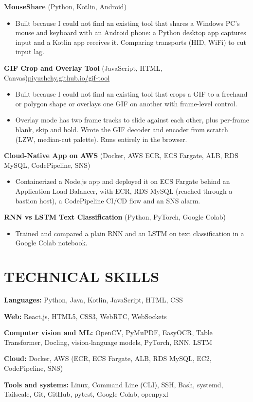 \documentclass[10pt,letterpaper]{article}
\begin{document}
\vspace{1pt}
\noindent\textbf{MouseShare} (Python, Kotlin, Android)\par
\begin{itemize}
  \item Built because I could not find an existing tool that shares a Windows PC's mouse and keyboard with an Android phone: a Python desktop app captures input and a Kotlin app receives it. Comparing transports (HID, WiFi) to cut input lag.
\end{itemize}

\vspace{1pt}
\noindent\textbf{GIF Crop and Overlay Tool} (JavaScript, HTML, Canvas)\hfill \href{https://piyushchy.github.io/gif-tool/}{piyushchy.github.io/gif-tool}\par
\begin{itemize}
  \item Built because I could not find an existing tool that crops a GIF to a freehand or polygon shape or overlays one GIF on another with frame-level control.
  \item Overlay mode has two frame tracks to slide against each other, plus per-frame blank, skip and hold. Wrote the GIF decoder and encoder from scratch (LZW, median-cut palette). Runs entirely in the browser.
\end{itemize}

\vspace{1pt}
\noindent\textbf{Cloud-Native App on AWS} (Docker, AWS ECR, ECS Fargate, ALB, RDS MySQL, CodePipeline, SNS)\par
\begin{itemize}
  \item Containerized a Node.js app and deployed it on ECS Fargate behind an Application Load Balancer, with ECR, RDS MySQL (reached through a bastion host), a CodePipeline CI/CD flow and an SNS alarm.
\end{itemize}

\vspace{1pt}
\noindent\textbf{RNN vs LSTM Text Classification} (Python, PyTorch, Google Colab)\par
\begin{itemize}
  \item Trained and compared a plain RNN and an LSTM on text classification in a Google Colab notebook.
\end{itemize}

\section*{TECHNICAL SKILLS}
\textbf{Languages:} Python, Java, Kotlin, JavaScript, HTML, CSS\par
\textbf{Web:} React.js, HTML5, CSS3, WebRTC, WebSockets\par
\textbf{Computer vision and ML:} OpenCV, PyMuPDF, EasyOCR, Table Transformer, Docling, vision-language models, PyTorch, RNN, LSTM\par
\textbf{Cloud:} Docker, AWS (ECR, ECS Fargate, ALB, RDS MySQL, EC2, CodePipeline, SNS)\par
\textbf{Tools and systems:} Linux, Command Line (CLI), SSH, Bash, systemd, Tailscale, Git, GitHub, pytest, Google Colab, openpyxl\par
\end{document}
